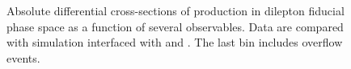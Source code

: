 \begin{figure}[ht]
  \quad\quad
  \caption{Absolute differential cross-sections of \tty production in dilepton fiducial phase space as a function of several observables. Data are compared with \madgraph simulation interfaced with \pythia and \herwig. The last bin includes overflow events.}
  \label{fig:pt_unfolded_dilep_dist_realdata_1}
\end{figure}

